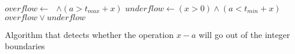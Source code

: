 \begin{algorithm}[H]
    \begin{algorithmic}
            \State $overflow \gets\text{ }$$ \wedge (a > t_{max} + x)$
            \State $underflow \gets (x > 0) \wedge (a < t_{min} + x)$
            \State \Return $overflow \vee underflow$
        \EndFunction
    \end{algorithmic}
    \caption{Algorithm that detects whether the operation $x - a$ will go out of the integer boundaries}
    \label{alg:basics:overflow:detect}
\end{algorithm}